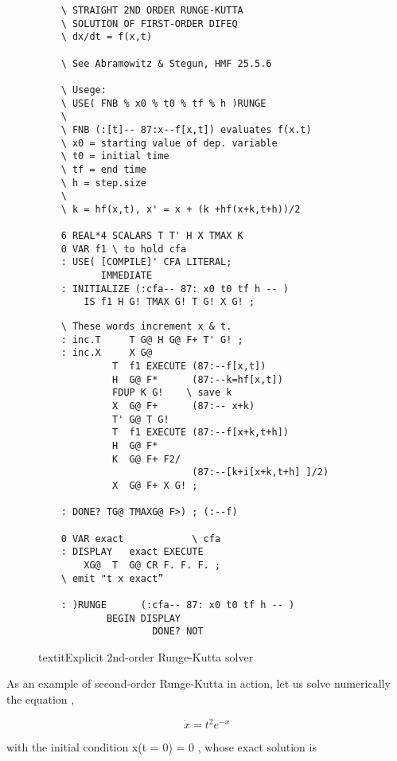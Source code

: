 \begin{figure}
    \tiny
\begin{tcolorbox}[sidebyside]
    \begin{lstlisting}
    \ STRAIGHT 2ND ORDER RUNGE-KUTTA
    \ SOLUTION OF FIRST-ORDER DIFEQ
    \ dx/dt = f(x,t)

    \ See Abramowitz & Stegun, HMF 25.5.6

    \ Usege:
    \ USE( FNB % x0 % t0 % tf % h )RUNGE
    \
    \ FNB (:[t]-- 87:x--f[x,t]) evaluates f(x.t)
    \ x0 = starting value of dep. variable
    \ t0 = initial time
    \ tf = end time
    \ h = step.size
    \
    \ k = hf(x,t), x' = x + (k +hf(x+k,t+h))/2

    6 REAL*4 SCALARS T T' H X TMAX K
    0 VAR f1 \ to hold cfa
    : USE( [COMPILE]' CFA LITERAL;
           IMMEDIATE
    : INITIALIZE (:cfa-- 87: x0 t0 tf h -- )
        IS f1 H G! TMAX G! T G! X G! ;
    \end{lstlisting}
\tcblower
    \begin{lstlisting}
    \ These words increment x & t.
    : inc.T     T G@ H G@ F+ T' G! ;
    : inc.X     X G@
             T  f1 EXECUTE (87:--f[x,t])
             H  G@ F*      (87:--k=hf[x,t])
             FDUP K G!    \ save k
             X  G@ F+      (87:-- x+k)
             T' G@ T G!
             T  f1 EXECUTE (87:--f[x+k,t+h])
             H  G@ F*
             K  G@ F+ F2/
                           (87:--[k+i[x+k,t+h] ]/2)
             X  G@ F+ X G! ;

    : DONE? TG@ TMAXG@ F>) ; (:--f)

    0 VAR exact            \ cfa
    : DISPLAY   exact EXECUTE
        XG@  T  G@ CR F. F. F. ;
    \ emit "t x exact”

    : )RUNGE      (:cfa-- 87: x0 t0 tf h -- )
            BEGIN DISPLAY
                    DONE? NOT
    \end{lstlisting}
\end{tcolorbox}
    \caption{textit{Explicit 2nd-order Runge-Kutta solver}}
\label{fig:06_07}
\end{figure}

As an example of second-order Runge-Kutta in action, let us solve numerically the equation ,

\begin{equation}
    \dot{x} = t^2 e^{-x}
    \label{eq:06_21} 
\end{equation}

with the initial condition x(t = 0) = 0 , whose exact solution is

